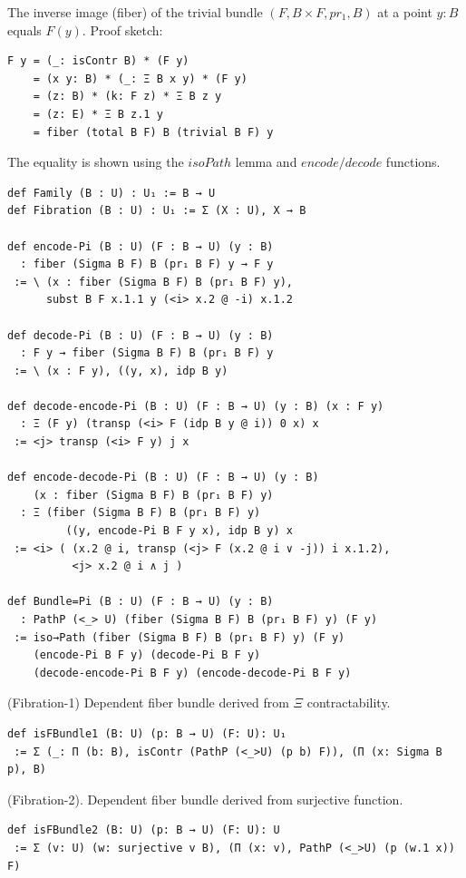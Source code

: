 \documentclass{article}
\begin{document}
\newpage
\begin{theorem}
The inverse image (fiber) of the trivial bundle \( (F, B \times F, pr_1, B) \) at a point \( y: B \)
equals \( F(y) \). Proof sketch:
\begin{lstlisting}[mathescape=true]
F y = (_: isContr B) * (F y)
    = (x y: B) * (_: Ξ B x y) * (F y)
    = (z: B) * (k: F z) * Ξ B z y
    = (z: E) * Ξ B z.1 y
    = fiber (total B F) B (trivial B F) y
\end{lstlisting}
The equality is shown using the $isoPath$ lemma and $encode/decode$ functions.
\begin{lstlisting}[mathescape=true]
def Family (B : U) : U₁ := B → U
def Fibration (B : U) : U₁ := Σ (X : U), X → B

def encode-Pi (B : U) (F : B → U) (y : B)
  : fiber (Sigma B F) B (pr₁ B F) y → F y
 := \ (x : fiber (Sigma B F) B (pr₁ B F) y),
      subst B F x.1.1 y (<i> x.2 @ -i) x.1.2

def decode-Pi (B : U) (F : B → U) (y : B)
  : F y → fiber (Sigma B F) B (pr₁ B F) y
 := \ (x : F y), ((y, x), idp B y)

def decode-encode-Pi (B : U) (F : B → U) (y : B) (x : F y)
  : Ξ (F y) (transp (<i> F (idp B y @ i)) 0 x) x
 := <j> transp (<i> F y) j x

def encode-decode-Pi (B : U) (F : B → U) (y : B)
    (x : fiber (Sigma B F) B (pr₁ B F) y)
  : Ξ (fiber (Sigma B F) B (pr₁ B F) y)
         ((y, encode-Pi B F y x), idp B y) x
 := <i> ( (x.2 @ i, transp (<j> F (x.2 @ i ∨ -j)) i x.1.2),
          <j> x.2 @ i ∧ j )

def Bundle=Pi (B : U) (F : B → U) (y : B)
  : PathP (<_> U) (fiber (Sigma B F) B (pr₁ B F) y) (F y)
 := iso→Path (fiber (Sigma B F) B (pr₁ B F) y) (F y)
    (encode-Pi B F y) (decode-Pi B F y)
    (decode-encode-Pi B F y) (encode-decode-Pi B F y)
\end{lstlisting}
\end{theorem}

\newpage
\begin{definition} (Fibration-1) Dependent fiber bundle derived from $\Xi$ contractability.
\begin{lstlisting}
def isFBundle1 (B: U) (p: B → U) (F: U): U₁
 := Σ (_: Π (b: B), isContr (PathP (<_>U) (p b) F)), (Π (x: Sigma B p), B)
\end{lstlisting}
\end{definition}

\begin{definition} (Fibration-2). Dependent fiber bundle derived from surjective function.
\begin{lstlisting}
def isFBundle2 (B: U) (p: B → U) (F: U): U
 := Σ (v: U) (w: surjective v B), (Π (x: v), PathP (<_>U) (p (w.1 x)) F)
\end{lstlisting}
\end{definition}
\end{document}
